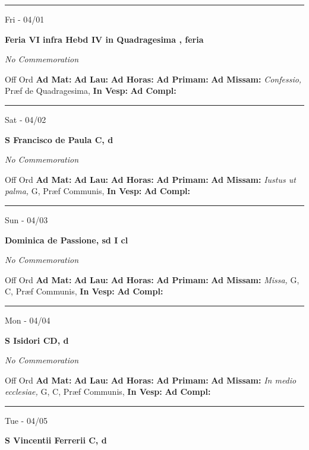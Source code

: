 \documentclass[letterpaper, 10pt]{article}
\begin{document}
\hrule
\begin{center}
Fri - 04/01
\end{center}\textbf{ \large Feria VI infra Hebd IV in Quadragesima , \textnormal{\normalsize feria}}

\textit{No Commemoration}\begin{justify}
Off Ord
\textbf{Ad Mat: }
\textbf{Ad Lau: }
\textbf{Ad Horas: }
\textbf{Ad Primam: }
\textbf{Ad Missam:} \textit{Confessio, } Præf de Quadragesima, 
\textbf{In Vesp: }
\textbf{Ad Compl: }\end{justify}



\hrule
\begin{center}
Sat - 04/02
\end{center}\textbf{ \large S Francisco de Paula C, \textnormal{\normalsize d}}

\textit{No Commemoration}\begin{justify}
Off Ord
\textbf{Ad Mat: }
\textbf{Ad Lau: }
\textbf{Ad Horas: }
\textbf{Ad Primam: }
\textbf{Ad Missam:} \textit{Iustus ut palma, } G, Præf Communis, 
\textbf{In Vesp: }
\textbf{Ad Compl: }\end{justify}



\hrule
\begin{center}
Sun - 04/03
\end{center}\textbf{ \large Dominica de Passione, \textnormal{\normalsize sd I cl}}

\textit{No Commemoration}\begin{justify}
Off Ord
\textbf{Ad Mat: }
\textbf{Ad Lau: }
\textbf{Ad Horas: }
\textbf{Ad Primam: }
\textbf{Ad Missam:} \textit{Missa, } G, C, Præf Communis, 
\textbf{In Vesp: }
\textbf{Ad Compl: }\end{justify}



\hrule
\begin{center}
Mon - 04/04
\end{center}\textbf{ \large S Isidori CD, \textnormal{\normalsize d}}

\textit{No Commemoration}\begin{justify}
Off Ord
\textbf{Ad Mat: }
\textbf{Ad Lau: }
\textbf{Ad Horas: }
\textbf{Ad Primam: }
\textbf{Ad Missam:} \textit{In medio ecclesiae, } G, C, Præf Communis, 
\textbf{In Vesp: }
\textbf{Ad Compl: }\end{justify}



\hrule
\begin{center}
Tue - 04/05
\end{center}\textbf{ \large S Vincentii Ferrerii C, \textnormal{\normalsize d}}
\end{document}
